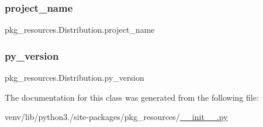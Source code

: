 \subsubsection{\texorpdfstring{project\+\_\+name}{project\_name}}
{\footnotesize\ttfamily pkg\+\_\+resources.\+Distribution.\+project\+\_\+name}

\mbox{\label{classpkg__resources_1_1Distribution_a94c84ff74167eef63fecce9f5e3c2a85}} 
\subsubsection{\texorpdfstring{py\+\_\+version}{py\_version}}
{\footnotesize\ttfamily pkg\+\_\+resources.\+Distribution.\+py\+\_\+version}



The documentation for this class was generated from the following file\+:\begin{DoxyCompactItemize}
\item 
venv/lib/python3./site-\/packages/pkg\+\_\+resources/\hyperlink{venv_2lib_2python3_89_2site-packages_2pkg__resources_2____init_____8py}{\+\_\+\+\_\+init\+\_\+\+\_\+.\+py}\end{DoxyCompactItemize}

